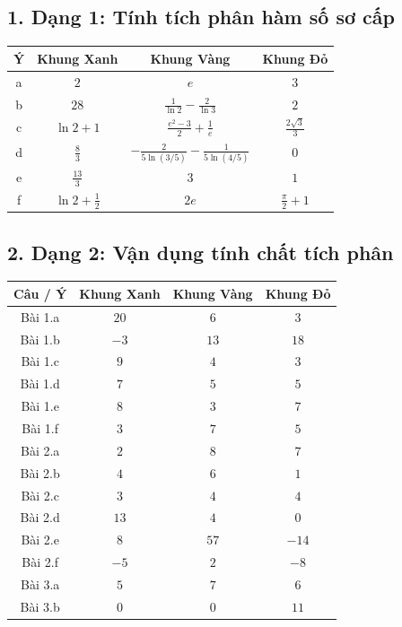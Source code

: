 \documentclass[12pt]{article}
\begin{document}
\subsection*{1. Dạng 1: Tính tích phân hàm số sơ cấp}
\begin{center}
	\begin{tabular}{|c|c|c|c|}
		\hline
		\textbf{Ý} & \textbf{Khung Xanh} & \textbf{Khung Vàng} & \textbf{Khung Đỏ} \\
		\hline
		a & $2$ & $e$ & $3$ \\
		\hline
		b & $28$ & $\displaystyle \frac{1}{\ln 2} - \frac{2}{\ln 3}$ & $2$ \\
		\hline
		c & $\ln 2 + 1$ & $\displaystyle \frac{e^2 - 3}{2} + \frac{1}{e}$ & $\displaystyle \frac{2\sqrt{3}}{3}$ \\
		\hline
		d & $\displaystyle \frac{8}{3}$ & $\displaystyle -\frac{2}{5\ln(3/5)} - \frac{1}{5\ln(4/5)}$ & $0$ \\
		\hline
		e & $\displaystyle \frac{13}{3}$ & $3$ & $1$ \\
		\hline
		f & $\ln 2 + \displaystyle \frac{1}{2}$ & $2e$ & $\displaystyle \frac{\pi}{2} + 1$ \\
		\hline
	\end{tabular}
\end{center}

\subsection*{2. Dạng 2: Vận dụng tính chất tích phân}
\begin{center}
	\begin{tabular}{|c|c|c|c|}
		\hline
		\textbf{Câu / Ý} & \textbf{Khung Xanh} & \textbf{Khung Vàng} & \textbf{Khung Đỏ} \\
		\hline
		Bài 1.a & $20$ & $6$ & $3$ \\
		\hline
		Bài 1.b & $-3$ & $13$ & $18$ \\
		\hline
		Bài 1.c & $9$ & $4$ & $3$ \\
		\hline
		Bài 1.d & $7$ & $5$ & $5$ \\
		\hline
		Bài 1.e & $8$ & $3$ & $7$ \\
		\hline
		Bài 1.f & $3$ & $7$ & $5$ \\
		\hline
		Bài 2.a & $2$ & $8$ & $7$ \\
		\hline
		Bài 2.b & $4$ & $6$ & $1$ \\
		\hline
		Bài 2.c & $3$ & $4$ & $4$ \\
		\hline
		Bài 2.d & $13$ & $4$ & $0$ \\
		\hline
		Bài 2.e & $8$ & $57$ & $-14$ \\
		\hline
		Bài 2.f & $-5$ & $2$ & $-8$ \\
		\hline
		Bài 3.a & $5$ & $7$ & $6$ \\
		\hline
		Bài 3.b & $0$ & $0$ & $11$ \\
		\hline
	\end{tabular}
\end{center}
\end{document}
